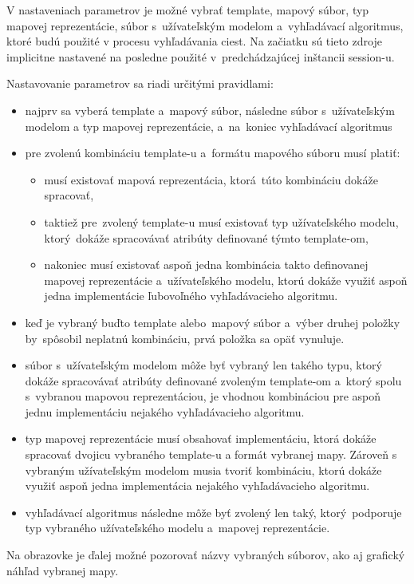 \documentclass[12pt,a4paper]{report}
\begin{document}
V nastaveniach parametrov je možné vybrať template, mapový súbor, typ mapovej reprezentácie, súbor s~užívateľským modelom a~vyhľadávací algoritmus, ktoré budú použité v procesu vyhľadávania ciest. Na začiatku sú tieto zdroje implicitne nastavené na posledne použité v~predchádzajúcej inštancii session-u.

Nastavovanie parametrov sa riadi určitými pravidlami:
\begin{itemize}
    \item najprv sa vyberá template a~mapový súbor, následne súbor s~užívateľským modelom a typ mapovej reprezentácie, a~na~koniec vyhľadávací algoritmus
    \item pre zvolenú kombináciu template-u a~formátu mapového súboru musí platiť:
    \begin{itemize}
        \item musí existovať mapová reprezentácia, ktorá~túto kombináciu dokáže spracovať,
        \item taktiež pre~zvolený template-u musí existovať typ užívateľského modelu, ktorý~dokáže spracovávať atribúty definované týmto template-om,
        \item nakoniec musí existovať aspoň jedna kombinácia takto definovanej mapovej reprezentácie a~užívateľského modelu, ktorú dokáže využiť aspoň jedna implementácie ľubovoľného vyhľadávacieho algoritmu.
    \end{itemize}
    \item keď je vybraný buďto template alebo~mapový súbor a~výber druhej položky by~spôsobil neplatnú kombináciu, prvá položka sa opäť vynuluje.
    \item súbor s~užívateľským modelom môže byť vybraný len takého typu, ktorý dokáže spracovávať atribúty definované zvoleným template-om a~ktorý spolu s~vybranou mapovou reprezentáciou, je vhodnou kombináciou pre aspoň jednu implementáciu nejakého vyhľadávacieho algoritmu.
    \item typ mapovej reprezentácie musí obsahovať implementáciu, ktorá dokáže spracovať dvojicu vybraného template-u a formát vybranej mapy. Zároveň s vybraným užívateľským modelom musia tvoriť kombináciu, ktorú dokáže využiť aspoň jedna implementácia nejakého vyhľadávacieho algoritmu.
    \item vyhľadávací algoritmus následne môže byť zvolený len taký, ktorý~podporuje typ vybraného užívateľského modelu a~mapovej reprezentácie.
\end{itemize}

Na obrazovke je ďalej možné pozorovať názvy vybraných súborov, ako aj grafický náhľad vybranej mapy.
\end{document}
